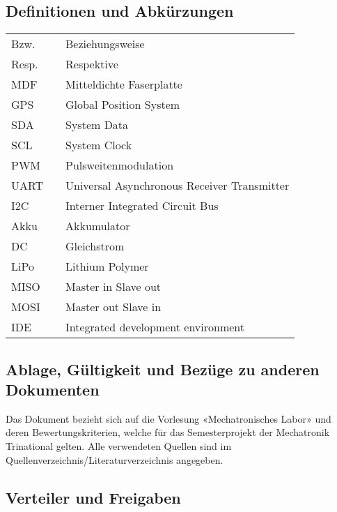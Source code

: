 \subsection{Definitionen und Abkürzungen}
\begin{table}[H]
    \label{tab:abkuerzungen}
    \begin{tabular}{lll}
    Bzw.  &  & Beziehungsweise                             \\
    Resp. &  & Respektive                                  \\
    MDF   &  & Mitteldichte Faserplatte                    \\
    GPS   &  & Global Position System                      \\
    SDA   &  & System Data                                 \\
    SCL   &  & System Clock                                \\
    PWM   &  & Pulsweitenmodulation                        \\
    UART  &  & Universal Asynchronous Receiver Transmitter \\
    I2C   &  & Interner Integrated Circuit Bus             \\
    Akku  &  & Akkumulator                                 \\
    DC    &  & Gleichstrom                                 \\
    LiPo  &  & Lithium Polymer                             \\
    MISO  &  & Master in Slave out                         \\
    MOSI  &  & Master out Slave in                         \\
    IDE   &  & Integrated development environment         
    \end{tabular}
\end{table}

\subsection{Ablage, Gültigkeit und Bezüge zu anderen Dokumenten}
Das Dokument bezieht sich auf die Vorlesung «Mechatronisches Labor» und deren Bewertungskriterien, welche für das Semesterprojekt der Mechatronik Trinational gelten. Alle verwendeten Quellen sind im Quellenverzeichnis/Literaturverzeichnis  angegeben.

\subsection{Verteiler und Freigaben}

